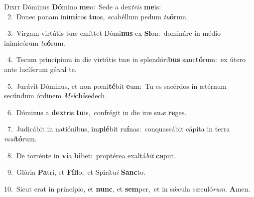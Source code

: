 \lettrine{\initial\textcolor{\initialcolor}{D}}{ixit} Dóminus \textbf{Dó}\-mino \textbf{me}\-o:~\star Sede a dex\textit{tris} \textbf{me}\-is:\\
{\numbfont\textcolor{\numbcolor}{~2.}}~Donec ponam ini\-\textbf{mí}\-cos \textbf{tu}\-os,~\star scabéllum pedum \textit{tu}\-\textbf{ó}rum.\par
{\numbfont\textcolor{\numbcolor}{~3.}}~Virgam virtútis tuæ emíttet Dómi\textbf{nus} ex \textbf{Si}\-on:~\star domináre in médio inimicórum \textit{tu}\-\textbf{ó}rum.\par
{\numbfont\textcolor{\numbcolor}{~4.}}~Tecum princípium in die virtútis tuæ in splendóri\textbf{bus} sanc\-\textbf{tó}\-rum:~\star ex útero ante lucíferum gé\-\textit{nu}\-\textbf{i} te.\par
{\numbfont\textcolor{\numbcolor}{~5.}}~Jurávit Dóminus, et non pœni\-\textbf{té}\-bit \textbf{e}\-um:~\star Tu es sacérdos in ætérnum secúndum órdinem \textit{Mel}\-\textbf{chí}sedech.\par
{\numbfont\textcolor{\numbcolor}{~6.}}~Dóminus a \textbf{dex}\-tris \textbf{tu}\-is,~\star confrégit in die iræ su\textit{æ} \textbf{re}\-ges.\par
{\numbfont\textcolor{\numbcolor}{~7.}}~Judicábit in natiónibus, im\-\textbf{plé}\-bit ru\-\textbf{í}\-nas:~\star conquassábit cápita in terra \textit{mul}\-\textbf{tó}rum.\par
{\numbfont\textcolor{\numbcolor}{~8.}}~De torrénte in \textbf{vi}\-a \textbf{bi}\-bet:~\star proptérea exaltá\textit{bit} \textbf{ca}\-put.\par
{\numbfont\textcolor{\numbcolor}{~9.}}~Glória \textbf{Pa}\-tri, et \textbf{Fí}\-\textbf{li}o,~\star et Spirítu\textit{i} \textbf{Sanc}\-to.\par
{\numbfont\textcolor{\numbcolor}{10.}}~Sicut erat in princípio, et \textbf{nunc}\-, et \textbf{sem}\-per,~\star et in sǽcula sæculó\-\textit{rum}\-. \textbf{A}\-men.\par
